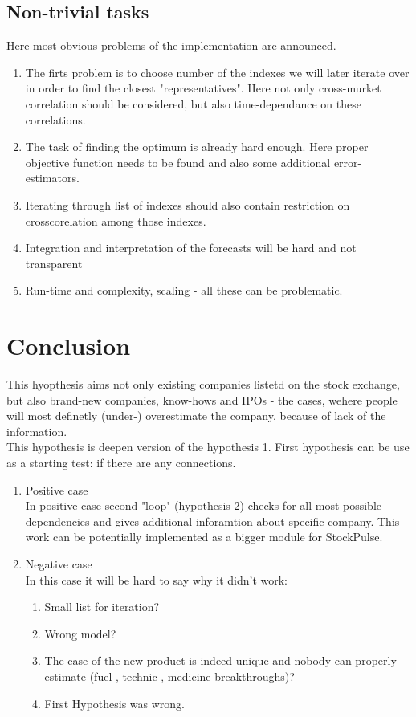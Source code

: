 \documentclass{article}
\begin{document}
\subsection{Non-trivial tasks}
Here most obvious problems of the implementation are announced.

\begin{enumerate}
	\item The firts problem is to choose number of the indexes we will later iterate over in order to find the closest "representatives". Here not only cross-murket correlation should be considered, but also time-dependance on these correlations.
	\item The task of finding the optimum is already hard enough. Here proper objective function needs to be found and also some additional error-estimators.
	\item Iterating through list of indexes should also contain restriction on crosscorelation among those indexes.
	\item Integration and interpretation of the forecasts will be hard and not transparent
	\item Run-time and complexity, scaling - all these can be problematic.  
\end{enumerate}

\newpage
\section {Conclusion}
This hyopthesis aims not only existing companies listetd on the stock exchange, but also brand-new companies, know-hows and IPOs - the cases, wehere people will most definetly (under-) overestimate the company, because of lack of the information.\\
This hypothesis is deepen version of the hypothesis 1. First hypothesis can be use as a starting test: if there are any connections.
\begin{enumerate}
	\item Positive case\\
In positive case second "loop" (hypothesis 2) checks for all most possible dependencies and gives additional inforamtion about specific company. This work can be potentially implemented as a bigger module for StockPulse.
	\item Negative case\\
In this case it will be hard to say why it didn't work: 
\begin{enumerate}
	\item Small list for iteration?
	\item Wrong model?
	\item The case of the new-product is indeed unique and nobody can properly estimate (fuel-, technic-, medicine-breakthroughs)?
	\item First Hypothesis was wrong.
\end{enumerate}
\end{enumerate}
\end{document}
